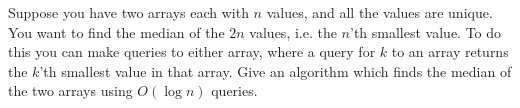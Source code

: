 \problem{}
Suppose you have two arrays each with $n$ values, and all the values are unique.  You want to find the median of the $2n$ values, i.e. the $n$'th smallest value.  To do this you can make queries to either array, where a query for $k$ to an array returns the $k$'th smallest value in that array.  Give an algorithm which finds the median of the two arrays using $O(\log n)$ queries.  

\solution{

}


\newpage